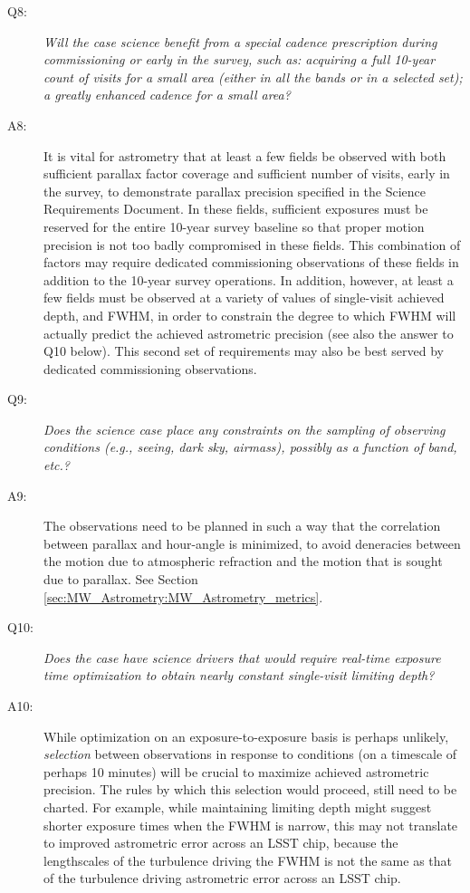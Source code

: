 \begin{description}
\item[Q8:] {\it Will the case science benefit from a special cadence
prescription during commissioning or early in the survey, such as:
acquiring a full 10-year count of visits for a small area (either in all
the bands or in a  selected set); a greatly enhanced cadence for a small
area?}

\item[A8:] It is vital for astrometry that at least a few fields
  be observed with both sufficient parallax factor coverage and
  sufficient number of visits, early in the survey, to demonstrate
  parallax precision specified in the Science Requirements
  Document. In these fields, sufficient exposures must be reserved for
  the entire 10-year survey baseline so that proper motion precision
  is not too badly compromised in these fields. This combination of
  factors may require dedicated commissioning observations of these
  fields in addition to the 10-year survey operations. In addition,
  however, at least a few fields must be observed at a variety of
  values of single-visit achieved depth, and FWHM, in order to
  constrain the degree to which FWHM will actually predict the
  achieved astrometric precision (see also the answer to Q10
  below). This second set of requirements may also be best served by
  dedicated commissioning observations.

\item[Q9:] {\it Does the science case place any constraints on the
sampling of observing conditions (e.g., seeing, dark sky, airmass),
possibly as a function of band, etc.?}

\item[A9:] The observations need to be planned in such a way
  that the correlation between parallax and hour-angle is minimized,
  to avoid deneracies between the motion due to atmospheric refraction and the motion that is sought due to parallax. See
  Section \ref{sec:MW_Astrometry:MW_Astrometry_metrics}.

\item[Q10:] {\it Does the case have science drivers that would require
real-time exposure time optimization to obtain nearly constant
single-visit limiting depth?}

\item[A10:] While optimization on an exposure-to-exposure basis
  is perhaps unlikely, {\it selection} between observations in
  response to conditions (on a timescale of perhaps 10 minutes) will
  be crucial to maximize achieved astrometric precision. The rules by
  which this selection would proceed, still need to be charted. For
  example, while maintaining limiting depth might suggest shorter
  exposure times when the FWHM is narrow, this may not translate to
  improved astrometric error across an LSST chip, because the
  lengthscales of the turbulence driving the FWHM is not the same as
  that of the turbulence driving astrometric error across an LSST chip.

\end{description}

\navigationbar

